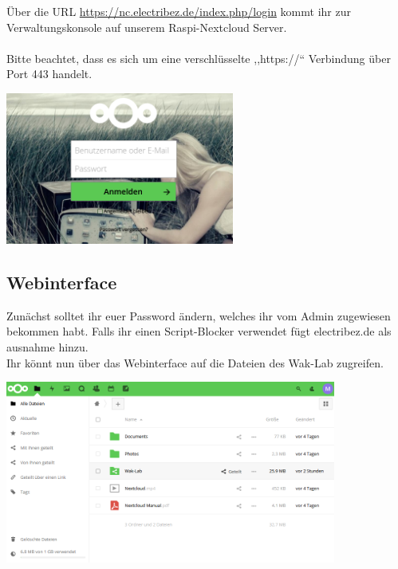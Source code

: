 Über die URL \url{https://nc.electribez.de/index.php/login} kommt ihr zur Verwaltungskonsole auf unserem Raspi-Nextcloud Server. \\
\ \\
Bitte beachtet, dass es sich um eine verschlüsselte ,,https://`` Verbindung über Port 443 handelt.\\

\begin{minipage}[t]{\textwidth}
  \centering
  \includegraphics[height=5cm]{pictures/Nextcloudlogin.png}
  \label{img:Nextcloudlogin}
\end{minipage}

\subsection{Webinterface}
Zunächst solltet ihr euer Password ändern, welches ihr vom Admin zugewiesen bekommen habt. Falls ihr einen Script-Blocker verwendet fügt electribez.de als ausnahme hinzu.\\
Ihr könnt nun über das Webinterface auf die Dateien des Wak-Lab zugreifen.\\
 
\begin{minipage}[t]{\textwidth}
  \centering
  \includegraphics[height=6cm]{pictures/NextcloudWebinterface.png}
  \label{img:NextcloudWebinterface}
\end{minipage}



